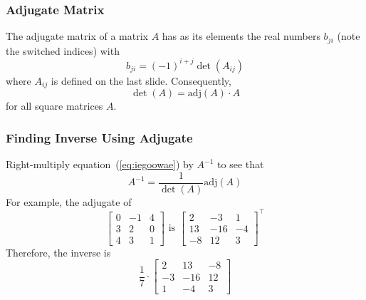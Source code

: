 \documentclass[xcolor=dvipsnames]{beamer}
\begin{document}
\begin{frame}
  \frametitle{Adjugate Matrix}
The \alert{adjugate matrix} of a matrix $A$ has as its elements the
real numbers $b_{ji}$ (note the switched indices) with
\begin{equation}
  \label{eq:quesieha}
  b_{ji}=(-1)^{i+j}\det(A_{ij})
\end{equation}
where $A_{ij}$ is defined on the last slide. Consequently,
\begin{equation}
  \label{eq:iegoowae}
  \det(A)=\mbox{adj}(A)\cdot{}A
\end{equation}
for all square matrices $A$.
\end{frame}

\begin{frame}
  \frametitle{Finding Inverse Using Adjugate}
  Right-multiply equation~(\ref{eq:iegoowae}) by $A^{-1}$ to see that
  \begin{equation}
    \label{eq:foomochu}
    A^{-1}=\frac{1}{\det(A)}\mbox{adj}(A)
  \end{equation}
  For example, the adjugate of
  \begin{equation}
    \label{eq:soojohdi}
    \left[
      \begin{array}{ccc}
        0 & -1 & 4 \\
        3 & 2 & 0 \\
        4 & 3 & 1 
      \end{array}\right]\mbox{ is }\left[
      \begin{array}{ccc}
        2 & -3 & 1 \\
        13 & -16 & -4 \\
        -8 & 12 & 3 
\end{array}\right]^{\intercal}
  \end{equation}
  Therefore, the inverse is
  \begin{equation}
    \label{eq:fiaphaid}
    \frac{1}{7}\cdot\left[
      \begin{array}{ccc}
        2 & 13 & -8 \\
        -3 & -16 & 12 \\
        1 & -4 & 3 
      \end{array}\right]
  \end{equation}
\end{frame}
\end{document}
